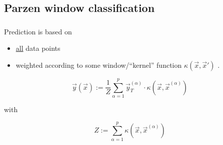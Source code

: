 

\subsection{Parzen window classification}


\begin{frame}\frametitle{\subsecname}

Prediction is based on 
\begin{itemize}
\item \underline{all} data points 
\item {} weighted according to some window/``kernel'' function $\kappa(\vec x, \vec x')$ .
\end{itemize}

\begin{equation}
\vec y(\vec x) := \frac{1}{Z} \sum_{\alpha=1}^{p} \vec y_T^{(\alpha)} \cdot \kappa(\vec x, \vec x^{(\alpha)})
\end{equation}

with

\begin{equation}
Z := \sum_{\alpha=1}^{p} \kappa(\vec x, \vec x^{(\alpha)})
\end{equation}

\end{frame}

